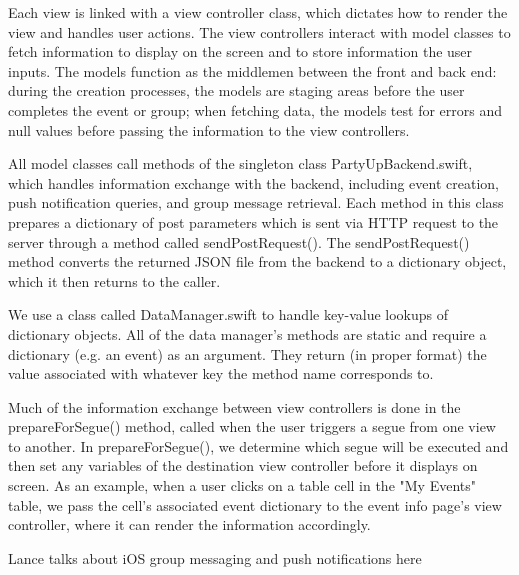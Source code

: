 \documentclass[12pt]{article}
\begin{document}
\bigskip

Each view is linked with a view controller class, which dictates how to render the view and handles user actions. The view controllers interact with model classes to fetch information to display on the screen and to store information the user inputs. The models function as the middlemen between the front and back end: during the creation processes, the models are staging areas before the user completes the event or group; when fetching data, the models test for errors and null values before passing the information to the view controllers.

\bigskip

All model classes call methods of the singleton class PartyUpBackend.swift, which handles information exchange with the backend, including event creation, push notification queries, and group message retrieval. Each method in this class prepares a dictionary of post parameters which is sent via HTTP request to the server through a method called sendPostRequest(). The sendPostRequest() method converts the returned JSON file from the backend to a dictionary object, which it then returns to the caller.

\bigskip

We use a class called DataManager.swift to handle key-value lookups of dictionary objects. All of the data manager's methods are static and require a dictionary (e.g. an event) as an argument. They return (in proper format) the value associated with whatever key the method name corresponds to. 

\bigskip

Much of the information exchange between view controllers is done in the prepareForSegue() method, called when the user triggers a segue from one view to another. In prepareForSegue(), we determine which segue will be executed and then set any variables of the destination view controller before it displays on screen. As an example, when a user clicks on a table cell in the "My Events" table, we pass the cell's associated event dictionary to the event info page's view controller, where it can render the information accordingly. 

\bigskip

Lance talks about iOS group messaging and push notifications here
\end{document}
